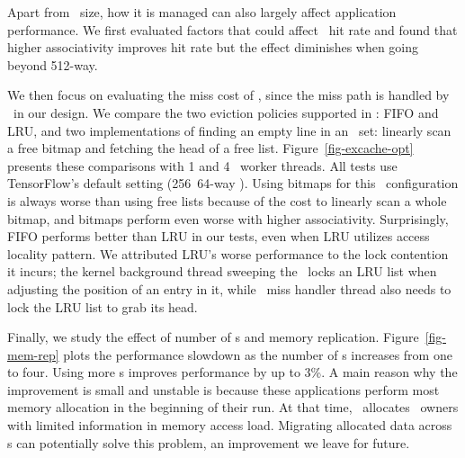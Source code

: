 \documentclass[10pt,times,twocolumn]{z2-article}
\begin{document}
{{{{{{{
Apart from \excache\ size, how it is managed can also largely affect application performance.
We first evaluated factors that could affect \excache\ hit rate and found that higher associativity improves hit rate
but the effect diminishes when going beyond 512-way.

We then focus on evaluating the miss cost of \excache, since the miss path is handled by \lego\ in our design.
We compare the two eviction policies supported in \lego: FIFO and LRU,
and two implementations of finding an empty line in an \excache\ set: linearly scan a free bitmap
and fetching the head of a free list.
Figure~\ref{fig-excache-opt} presents these comparisons with 1 and 4 \mcomponent\ worker threads. 
All tests use TensorFlow's default setting (256\MB\ 64-way \excache).
Using bitmaps for this \excache\ configuration is always worse than using free lists
because of the cost to linearly scan a whole bitmap,
and bitmaps perform even worse with higher associativity.
Surprisingly, FIFO performs better than LRU in our tests, even when LRU utilizes access locality pattern.
We attributed LRU's worse performance to the lock contention it incurs;
the kernel background thread sweeping the \excache\ locks an LRU list when adjusting the position of an entry in it,
while \excache\ miss handler thread also needs to lock the LRU list to grab its head.

%
Finally, we study the effect of number of \mcomponent s and memory replication.
Figure~\ref{fig-mem-rep} plots the performance slowdown as the number of \mcomponent s increases from one to four.
Using more \mcomponent s improves performance by up to 3\%.
A main reason why the improvement is small and unstable is because these applications perform
most memory allocation in the beginning of their run.
At that time, \lego\ allocates \vregion\ owners with limited information in memory access load.
Migrating allocated data across \mcomponent s can potentially solve this problem,
an improvement we leave for future.

}}}}}}}
\end{document}
